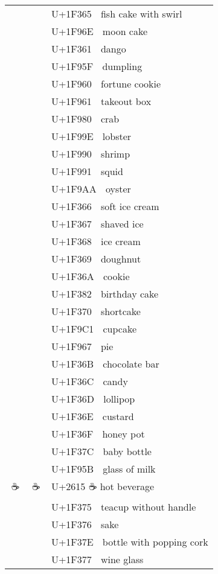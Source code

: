 \documentclass[a4paper,12pt]{article}
\newcommand{\fontA}[1]{{\fontspec[RawFeature={mode=harf,+dist,+ccmp}]{Segoe UI Emoji} #1}}
\newcommand{\fontB}[1]{{\fontspec[RawFeature={mode=harf,+dist,+ccmp}]{Noto Color Emoji} #1}}
\begin{document}
\begin{longtable}[c]{ccp{0.8\linewidth}}
\fontA{🍥}&\fontB{🍥}&U+1F365 🍥 fish cake with swirl\\
\fontA{🥮}&\fontB{🥮}&U+1F96E 🥮 moon cake\\
\fontA{🍡}&\fontB{🍡}&U+1F361 🍡 dango\\
\fontA{🥟}&\fontB{🥟}&U+1F95F 🥟 dumpling\\
\fontA{🥠}&\fontB{🥠}&U+1F960 🥠 fortune cookie\\
\fontA{🥡}&\fontB{🥡}&U+1F961 🥡 takeout box\\
\fontA{🦀}&\fontB{🦀}&U+1F980 🦀 crab\\
\fontA{🦞}&\fontB{🦞}&U+1F99E 🦞 lobster\\
\fontA{🦐}&\fontB{🦐}&U+1F990 🦐 shrimp\\
\fontA{🦑}&\fontB{🦑}&U+1F991 🦑 squid\\
\fontA{🦪}&\fontB{🦪}&U+1F9AA 🦪 oyster\\
\fontA{🍦}&\fontB{🍦}&U+1F366 🍦 soft ice cream\\
\fontA{🍧}&\fontB{🍧}&U+1F367 🍧 shaved ice\\
\fontA{🍨}&\fontB{🍨}&U+1F368 🍨 ice cream\\
\fontA{🍩}&\fontB{🍩}&U+1F369 🍩 doughnut\\
\fontA{🍪}&\fontB{🍪}&U+1F36A 🍪 cookie\\
\fontA{🎂}&\fontB{🎂}&U+1F382 🎂 birthday cake\\
\fontA{🍰}&\fontB{🍰}&U+1F370 🍰 shortcake\\
\fontA{🧁}&\fontB{🧁}&U+1F9C1 🧁 cupcake\\
\fontA{🥧}&\fontB{🥧}&U+1F967 🥧 pie\\
\fontA{🍫}&\fontB{🍫}&U+1F36B 🍫 chocolate bar\\
\fontA{🍬}&\fontB{🍬}&U+1F36C 🍬 candy\\
\fontA{🍭}&\fontB{🍭}&U+1F36D 🍭 lollipop\\
\fontA{🍮}&\fontB{🍮}&U+1F36E 🍮 custard\\
\fontA{🍯}&\fontB{🍯}&U+1F36F 🍯 honey pot\\
\fontA{🍼}&\fontB{🍼}&U+1F37C 🍼 baby bottle\\
\fontA{🥛}&\fontB{🥛}&U+1F95B 🥛 glass of milk\\
\fontA{☕}&\fontB{☕}&U+2615 ☕ hot beverage\\
\fontA{🍵}&\fontB{🍵}&U+1F375 🍵 teacup without handle\\
\fontA{🍶}&\fontB{🍶}&U+1F376 🍶 sake\\
\fontA{🍾}&\fontB{🍾}&U+1F37E 🍾 bottle with popping cork\\
\fontA{🍷}&\fontB{🍷}&U+1F377 🍷 wine glass\\

\end{longtable}
\end{document}
